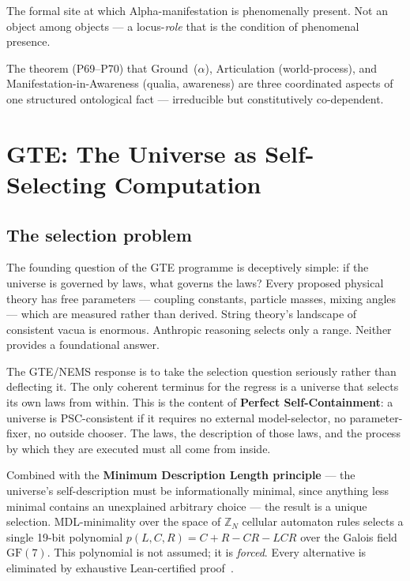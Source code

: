 \documentclass[11pt]{article}
\theoremstyle{remark}
\newcommand{\OntL}{\mathcal{L}}
\begin{document}
\begin{tcolorbox}[colback=gray!14,colframe=gray!55!black,title={Core Vocabulary (concise)}]
\begin{termlist}
\item[Awareness-Locus ($\OntL$)]
  The formal site at which Alpha-manifestation is phenomenally present. Not an object
  among objects --- a locus-\emph{role} that is the condition of phenomenal presence.

\item[Three-Aspect Synthesis]
  The theorem (P69--P70) that Ground~($\alpha$), Articulation (world-process), and
  Manifestation-in-Awareness (qualia, awareness) are three coordinated aspects of one
  structured ontological fact --- irreducible but constitutively co-dependent.
\end{termlist}
\end{tcolorbox}

\section{GTE: The Universe as Self-Selecting Computation}\label{sec:gte}

\subsection{The selection problem}

The founding question of the GTE programme is deceptively simple: if the universe is
governed by laws, what governs the laws? Every proposed physical theory has free
parameters --- coupling constants, particle masses, mixing angles --- which are measured
rather than derived. String theory's landscape of consistent vacua is enormous.
Anthropic reasoning selects only a range. Neither provides a foundational answer.

The GTE/NEMS response is to take the selection question seriously rather than deflecting
it. The only coherent terminus for the regress is a universe that selects its own laws
from within. This is the content of \textbf{Perfect Self-Containment}: a universe is
PSC-consistent if it requires no external model-selector, no parameter-fixer, no outside
chooser. The laws, the description of those laws, and the process by which they are
executed must all come from inside.

Combined with the \textbf{Minimum Description Length principle} --- the universe's
self-description must be informationally minimal, since anything less minimal contains
an unexplained arbitrary choice --- the result is a unique selection. MDL-minimality
over the space of $\mathbb{Z}_N$ cellular automaton rules selects a single 19-bit
polynomial $p(L,C,R) = C + R - CR - LCR$ over the Galois field $\mathrm{GF}(7)$.
This polynomial is not assumed; it is \emph{forced}. Every alternative is eliminated
by exhaustive Lean-certified proof~\cite{SpivackGTECompleteFramework}.
\end{document}
